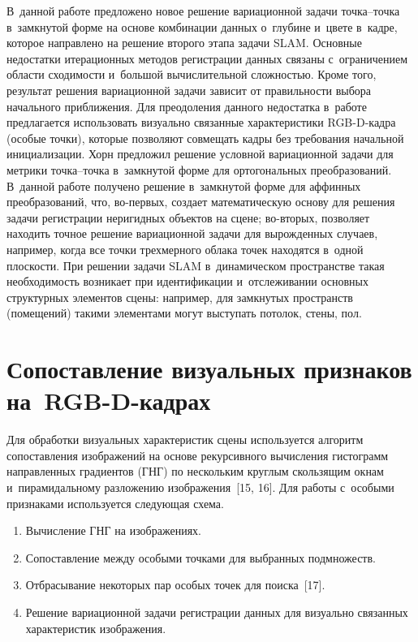 \begin{multicols}{2}
В~данной работе предложено новое решение вариационной задачи  
точ\-ка--точ\-ка в~замк\-ну\-той форме на основе комбинации данных о~глубине 
и~цвете в~кадре, которое на\-прав\-ле\-но на решение второго этапа задачи SLAM. 
Основные недостатки итерационных методов регистрации данных связаны 
с~ограничением области схо\-ди\-мости и~большой вы\-чис\-ли\-тель\-ной слож\-ностью. 
Кроме того, результат решения вариационной задачи зависит от пра\-виль\-ности 
выбора начального приближения. Для преодоления данного недостатка 
в~работе предлагается использовать визуально связанные характеристики 
RGB-D-кад\-ра (особые точки), которые позволяют совмещать кадры без 
требования начальной инициализации. Хорн предложил решение условной 
вариационной задачи для метрики точ\-ка--точ\-ка в~замкнутой форме для 
ортогональных преобразований. В~данной работе получено решение 
в~замк\-ну\-той форме для аффинных преобразований, что, во-пер\-вых, создает 
математическую основу для решения задачи регистрации неригидных объектов 
на сцене; во-вто\-рых, позволяет находить точное решение вариационной 
задачи для вырожденных случаев, например, когда все точки трехмерного 
облака точек находятся в~одной плоскости. При решении задачи SLAM 
в~динамическом пространстве такая необходимость возникает при 
идентификации и~отслеживании основных структурных элементов сцены: 
например, для замк\-ну\-тых пространств (помещений) такими элементами могут 
выступать потолок, стены, пол.
  
\section{Сопоставление визуальных признаков на~RGB-D-кадрах}

  Для обработки визуальных характеристик \mbox{сцены} используется алгоритм 
сопоставления изоб\-ра\-же\-ний на основе рекурсивного вы\-чис\-ле\-ния гистограмм 
на\-прав\-лен\-ных градиентов (ГНГ) по нескольким круглым скользящим окнам 
и~\mbox{пирамидальному} разложению изображения~[15, 16]. Для работы с~особыми 
признаками используется сле\-ду\-ющая схема.
  \begin{enumerate}[1.]
  \item  Вычисление ГНГ на изображениях.
  \item  Сопоставление между особыми точками для выбранных подмножеств.
  \item  Отбрасывание некоторых пар особых точек для поиска~[17].
  \item Решение вариационной задачи регистрации данных для визуально 
связанных характеристик изображения.
  \end{enumerate}
  

\end{multicols}

